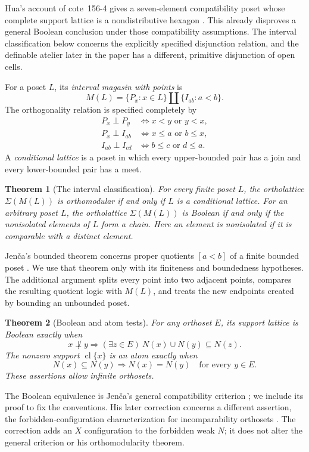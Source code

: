 \documentclass[11pt,a4paper]{article}
\newtheorem{theorem}{Theorem}[section]
\theoremstyle{definition}
\newcommand{\cl}{\operatorname{cl}}
\begin{document}
Hua's account of cote~156-4 gives a seven-element compatibility poset whose complete support lattice is a nondistributive hexagon \cite[Counterexample~79.1, pp.~369--370]{Hua}. This already disproves a general Boolean conclusion under those compatibility assumptions. The interval classification below concerns the explicitly specified disjunction relation, and the definable atelier later in the paper has a different, primitive disjunction of open cells.

For a poset $L$, its \emph{interval magasin with points} is
\[
 M(L)=\{P_x:x\in L\}\amalg\{I_{ab}:a<b\}.
\]
The orthogonality relation is specified completely by
\begin{align*}
 P_x\perp P_y&\iff x<y\text{ or }y<x,\\
 P_x\perp I_{ab}&\iff x\le a\text{ or }b\le x,\\
 I_{ab}\perp I_{cd}&\iff b\le c\text{ or }d\le a.
\end{align*}
A \emph{conditional lattice} is a poset in which every upper-bounded pair has a join and every lower-bounded pair has a meet.

\begin{theorem}[The interval classification]\label{thm:interval}
For every finite poset $L$, the ortholattice $\Sigma(M(L))$ is orthomodular if and only if $L$ is a conditional lattice. For an arbitrary poset $L$, the ortholattice $\Sigma(M(L))$ is Boolean if and only if the nonisolated elements of $L$ form a chain. Here an element is nonisolated if it is comparable with a distinct element.
\end{theorem}

Jen\v ca's bounded theorem concerns proper quotients $[a<b]$ of a finite bounded poset \cite[Theorem~4.10, preprint p.~10]{Jenca}. We use that theorem only with its finiteness and boundedness hypotheses. The additional argument splits every point into two adjacent points, compares the resulting quotient logic with $M(L)$, and treats the new endpoints created by bounding an unbounded poset.

\begin{theorem}[Boolean and atom tests]\label{thm:tests}
For any orthoset $E$, its support lattice is Boolean exactly when
\[
 x\not\perp y\Longrightarrow
 (\exists z\in E)\ N(x)\cup N(y)\subseteq N(z).
\]
The nonzero support $\cl\{x\}$ is an atom exactly when
\[
 N(x)\subseteq N(y)\Longrightarrow N(x)=N(y)
 \quad\text{for every }y\in E.
\]
These assertions allow infinite orthosets.
\end{theorem}
The Boolean equivalence is Jen\v ca's general compatibility criterion \cite[Theorem~3.2, p.~5]{Jenca2026}; we include its proof to fix the conventions. His later correction concerns a different assertion, the forbidden-configuration characterization for incomparability orthosets \cite[Theorem~1, pp.~2--4]{JencaCorrection}. The correction adds an $X$ configuration to the forbidden weak $N$; it does not alter the general criterion or his orthomodularity theorem.
\end{document}
